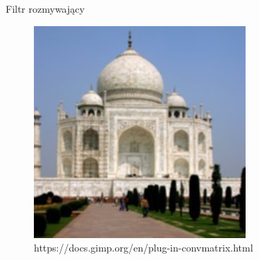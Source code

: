 \documentclass[xcolor=dvipsnames]{beamer}
\begin{document}
\begin{frame}{Filtr rozmywający}
\begin{minipage}[t]{0.6\linewidth}
\begin{figure}
			\includegraphics[width=\linewidth, height=0.7\textheight, keepaspectratio]{img/taj-blur.jpg}
			\caption{https://docs.gimp.org/en/plug-in-convmatrix.html}
		\end{figure}
	\end{minipage}
\end{frame}
\end{document}
